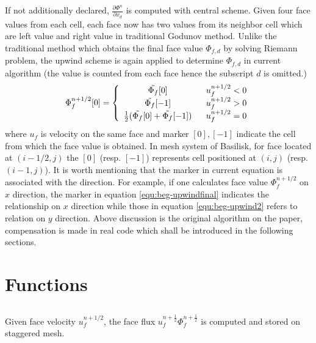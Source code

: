 If not additionally declared, $\frac{\partial \Phi^n}{\partial x_d}$ is computed with central scheme.
Given four face values from each cell, each face now has two values from its neighbor cell which are left value and right value in traditional Godunov method. Unlike the traditional method which obtains the final face value $\Phi_{f,d}$ by solving Riemann problem, the upwind scheme is again applied to determine $\Phi_{f,d}$ in current algorithm (the value is counted from each face hence the subscript $d$ is omitted.)
\begin{equation}
    \Phi^{n+1/2}_{f}[0] = \left\{
    \begin{array}{cc}
         \Tilde{\Phi_f}[0]\ \ &u^{n+1/2}_f<0\\
         \Tilde{\Phi_f}[-1]\ \ &u^{n+1/2}_f>0\\
         \frac{1}{2}(\Tilde{\Phi_f}[0]+\Tilde{\Phi_f}[-1])\ \ &u^{n+1/2}_f=0
    \end{array}
    \right.
    \label{equ:beg-upwindfinal}
\end{equation}
where $u_f$ is velocity on the same face and marker $[0],[-1]$ indicate the cell from which the face value is obtained. In mesh system of Basilisk, for face located at $(i-1/2,j)$ the $[0]$ (resp. $[-1]$) represents cell positioned at $(i,j)$ (resp. $(i-1,j)$). It is worth mentioning that the marker in current equation is associated with the direction. For example, if one calculates face value $\Phi_f^{n+1/2}$ on $x$ direction, the marker in equation \ref{equ:beg-upwindfinal} indicates the relationship on $x$ direction while those in equation \ref{equ:beg-upwind2} refers to relation on $y$ direction. Above discussion is the original algorithm on the paper, compensation is made in real code which shall be introduced in the following sections.

\section{Functions}

\subsection{}
Given face velocity $u^{n+1/2}_f$, the face flux $u_{f}^{n+ \frac{1}{2}}\Phi_{f}^{n + \frac{1}{2}}$ is computed and stored on staggered mesh.
